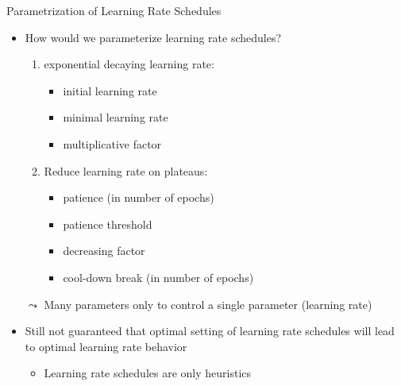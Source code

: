 \begin{frame}[c]{Parametrization of Learning Rate Schedules}

\begin{itemize}
\item How would we parameterize learning rate schedules?
\begin{enumerate}
	\item exponential decaying learning rate:
	\begin{itemize}
		\item initial learning rate
		\item minimal learning rate
		\item multiplicative factor
	\end{itemize}
	\pause
	\item Reduce learning rate on plateaus:
	\begin{itemize}
		\item patience (in number of epochs)
		\item patience threshold
		\item decreasing factor
		\item cool-down break (in number of epochs)
	\end{itemize}
\end{enumerate}
\pause
\medskip
\item[$\leadsto$] Many parameters only to control a single parameter (learning rate)
\pause   
\item Still not guaranteed that optimal setting of learning rate schedules will lead to optimal learning rate behavior
\begin{itemize}
	\item Learning rate schedules are only heuristics
\end{itemize}
\end{itemize}

\end{frame}

